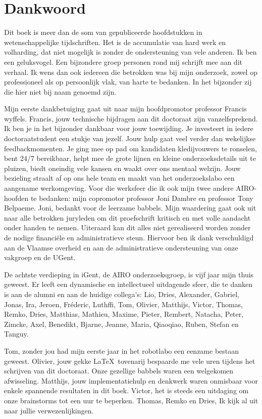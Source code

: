 \documentclass[\home/main.tex]{subfiles}
\begin{document}
\chapter{Dankwoord}

Dit boek is meer dan de som van gepubliceerde hoofdstukken in wetenschappelijke tijdschriften. Het is de accumulatie van hard werk en volharding, dat niet mogelijk is zonder de ondersteuning van vele anderen. Ik ben een geluksvogel. Een bijzondere groep personen rond mij schrijft mee aan dit verhaal. Ik wens dan ook iedereen die betrokken was bij mijn onderzoek, zowel op professioneel als op persoonlijk vlak, van harte te bedanken. In het bijzonder zij die hier niet bij naam genoemd zijn.
 
Mijn eerste dankbetuiging gaat uit naar mijn hoofdpromotor professor Francis wyffels. Francis, jouw technische bijdragen aan dit doctoraat zijn vanzelfsprekend. Ik ben je in het bijzonder dankbaar voor jouw toewijding. Je investeert in iedere doctoraatstudent een stukje van jezelf. Jouw hulp gaat veel verder dan wekelijkse feedbackmomenten. Je ging mee op pad om kandidaten kledijvouwers te ronselen, bent 24/7 bereikbaar, helpt mee de grote lijnen en kleine onderzoeksdetails uit te pluizen, biedt oneindig vele kansen en waakt over ons mentaal welzijn. Jouw bezieling straalt af op ons hele team en maakt van het onderzoekslabo een aangename werkomgeving.
Voor die werksfeer die ik ook mijn twee andere AIRO-hoofden te bedanken: mijn copromotor professor Joni Dambre en professor Tony Belpaeme. Joni, bedankt voor de leerzame babbels. 
Mijn waardering gaat ook uit naar alle betrokken juryleden om dit proefschrift kritisch en met volle aandacht onder handen te nemen.
Uiteraard kan dit alles niet gerealiseerd worden zonder de nodige financiële en administratieve steun. Hiervoor ben ik dank verschuldigd aan de Vlaamse overheid en aan de administratieve ondersteuning van onze vakgroep en de UGent.
 
De achtste verdieping in iGent, de AIRO onderzoeksgroep, is vijf jaar mijn thuis geweest. Er leeft een dynamische en intellectueel uitdagende sfeer, die te danken is aan de alumni en aan de huidige collega’s: Lio, Dries, Alexander, Gabriel, Jonas, Ira, Jeroen, Fréderic, Luthffi, Tom, Olivier, Matthijs, Victor, Thomas, Remko, Dries, Matthias, Mathieu, Maxime, Pieter, Rembert, Natacha, Peter, Zimcke, Axel, Benedikt, Bjarne, Jeanne, Maria, Qiaoqiao, Ruben, Stefan en Tanguy.
 
Tom, zonder jou had mijn eerste jaar in het robotlabo een eenzame bestaan geweest. Olivier, jouw gekke \LaTeX\ tovenarij bespaarde me vele uren tijdens het schrijven van dit doctoraat. Onze gezellige babbels waren een welgekomen afwisseling.
Matthijs, jouw implementatiehulp en denkwerk waren onmisbaar voor enkele spannende resultaten in dit boek.
Victor, het is steeds een uitdaging om onze brainstorms tot een uur te beperken.
Thomas, Remko en Dries, Ik kijk al uit naar jullie verwezenlijkingen. 
 
\end{document}
